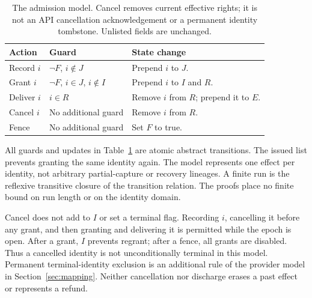 \documentclass[letterpaper]{article}
\begin{document}
\begin{table}[ht]
\centering
\begin{tabularx}{\linewidth}{@{}l X X@{}}
\toprule
Action & Guard & State change \\
\midrule
Record $i$ & $\neg F$, $i\notin J$ & Prepend $i$ to $J$. \\
Grant $i$ & $\neg F$, $i\in J$, $i\notin I$ & Prepend $i$ to $I$ and $R$. \\
Deliver $i$ & $i\in R$ & Remove $i$ from $R$; prepend it to $E$. \\
Cancel $i$ & No additional guard & Remove $i$ from $R$. \\
Fence & No additional guard & Set $F$ to true. \\
\bottomrule
\end{tabularx}
\caption{The admission model. Cancel removes current effective rights; it is
not an API cancellation acknowledgement or a permanent identity tombstone.
Unlisted fields are unchanged.}
\label{tab:steps}
\end{table}

All guards and updates in Table~\ref{tab:steps} are atomic abstract transitions.
The issued list prevents granting the same identity again. The model represents
one effect per identity, not arbitrary partial-capture or recovery lineages.
A finite run is the reflexive transitive closure of the transition relation.
The proofs place no finite bound on run length or on the identity domain.




Cancel does not add to $I$ or set a terminal flag. Recording $i$, cancelling it
before any grant, and then granting and delivering it is permitted while the
epoch is open. After a grant, $I$ prevents regrant; after a fence, all grants
are disabled. Thus a cancelled identity is not unconditionally terminal in
this model. Permanent terminal-identity exclusion is an additional rule of
the provider model in Section~\ref{sec:mapping}. Neither cancellation nor
discharge erases a past effect or represents a refund.
\end{document}

